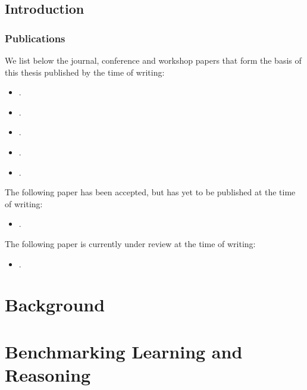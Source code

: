 \documentclass[a4paper,twoside,openright]{book}
\theoremstyle{plain}
\theoremstyle{definition}
\begin{document}
\chapter{Introduction}
\label{chap:intro}


\section{Publications}


We list below the journal, conference and workshop papers that form the basis of this thesis published by the time of writing:
%
\begin{itemize}
\nobibliography*
    \item \cite{lorello2023challenge} .
    \item \cite{manhaeve2024benchmarking} .
    \item \cite{lorello2025kandy} .
    \item \cite{lorello2024continual} .
    \item \cite{lorello2025neuro} .
 \end{itemize}
%
The following paper has been accepted, but has yet to be published at the time of writing:
%
\begin{itemize}
	\nobibliography*
	\item \cite{lorello2025ansya} .
\end{itemize}
%
The following paper is currently under review at the time of writing:
%
\begin{itemize}
\nobibliography*
    \item \cite{lorello2025ltlzinc} .
\end{itemize}

\part{Background}






\part{Benchmarking Learning and Reasoning}



\end{document}
